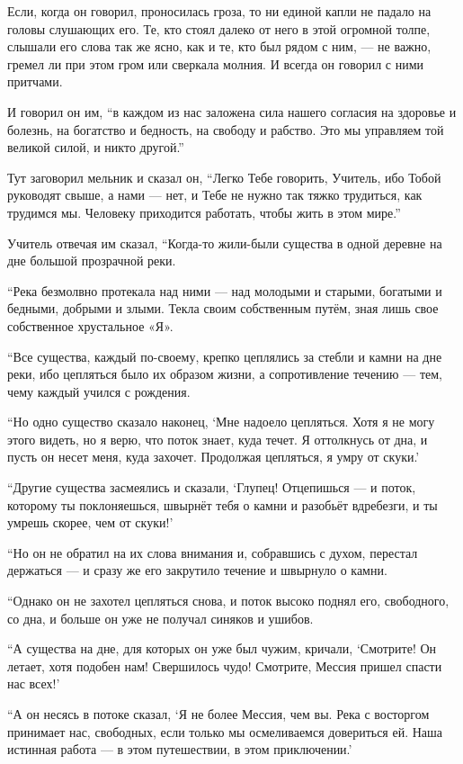 Если, когда он говорил, проносилась гроза, то ни единой капли не падало на головы слушающих его. Те, кто стоял далеко от него в этой огромной толпе, слышали его слова так же ясно, как и те, кто был рядом с ним, --- не важно, гремел ли при этом гром или сверкала молния. И всегда он говорил с ними притчами.

И говорил он им, ``в каждом из нас заложена сила нашего согласия на здоровье и болезнь, на богатство и бедность, на свободу и рабство. Это мы управляем той великой силой, и никто другой.''

Тут заговорил мельник и сказал он, ``Легко Тебе говорить, Учитель, ибо Тобой руководят свыше, а нами --- нет, и Тебе не нужно так тяжко трудиться, как трудимся мы. Человеку приходится работать, чтобы жить в этом мире.''

Учитель отвечая им сказал, ``Когда-то жили-были существа в одной деревне на дне большой прозрачной реки.

``Река безмолвно протекала над ними --- над молодыми и старыми, богатыми и бедными, добрыми и злыми. Текла своим собственным путём, зная лишь свое собственное хрустальное «Я».

``Все существа, каждый по-своему, крепко цеплялись за стебли и камни на дне реки, ибо цепляться было их образом жизни, а сопротивление течению --- тем, чему каждый учился с рождения.

``Но одно существо сказало наконец, `Мне надоело цепляться. Хотя я не могу этого видеть, но я верю, что поток знает, куда течет. Я оттолкнусь от дна, и пусть он несет меня, куда захочет. Продолжая цепляться, я умру от скуки.'

``Другие существа засмеялись и сказали, `Глупец! Отцепишься --- и поток, которому ты поклоняешься, швырнёт тебя о камни и разобьёт вдребезги, и ты умрешь скорее, чем от скуки!'

``Но он не обратил на их слова внимания и, собравшись с духом, перестал держаться --- и сразу же его закрутило течение и швырнуло о камни.

``Однако он не захотел цепляться снова, и поток высоко поднял его, свободного, со дна, и больше он уже не получал синяков и ушибов.

``А существа на дне, для которых он уже был чужим, кричали, `Смотрите! Он летает, хотя подобен нам! Свершилось чудо! Смотрите, Мессия пришел спасти нас всех!'

``А он несясь в потоке сказал, `Я не более Мессия, чем вы. Река с восторгом принимает нас, свободных, если только мы осмеливаемся довериться ей. Наша истинная работа --- в этом путешествии, в этом приключении.'

